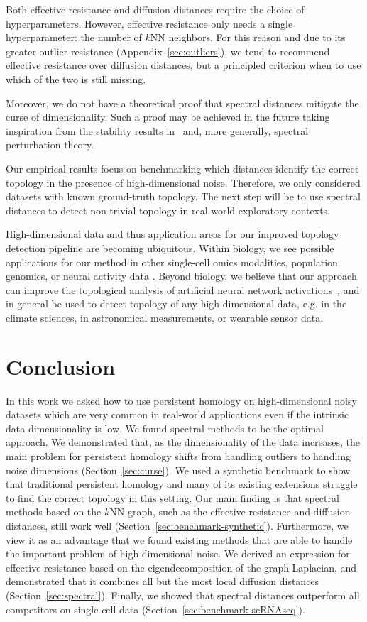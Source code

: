 \documentclass{article}
\theoremstyle{plain}
\theoremstyle{definition}
\theoremstyle{remark}
\begin{document}
Both effective resistance and diffusion distances require the choice of hyperparameters. However, effective resistance only needs a single hyperparameter: the number of $k$NN neighbors. For this reason and due to its greater outlier resistance (Appendix~\ref{sec:outliers}), we tend to recommend effective resistance over diffusion distances, but a principled criterion when to use which of the two is still missing.

Moreover, we do not have a theoretical proof that spectral distances mitigate the curse of dimensionality. Such a proof may be achieved in the future taking inspiration from the stability results in~\citep{carriere2020perslay, hiraoka2024curse, tran2019scale} and, more generally, spectral perturbation theory.

Our empirical results focus on benchmarking which distances identify the correct topology in the presence of high-dimensional noise. Therefore, we only considered datasets with known ground-truth topology. The next step will be to use spectral distances to detect non-trivial topology in real-world exploratory contexts.

High-dimensional data and thus application areas for our improved topology detection pipeline are becoming ubiquitous. Within biology, we see possible applications for our method in other single-cell omics modalities, population genomics, or neural activity data \citep{gardner2022toroidal, hermansen2024uncovering}. Beyond biology, we believe that our approach can improve the topological analysis of artificial neural network activations~\citep{naitzat2020topology}, and in general be used to detect topology of any high-dimensional data, e.g. in the climate sciences, in astronomical measurements, or wearable sensor data.

\section{Conclusion}

In this work we asked how to use persistent homology on high-dimensional noisy datasets which are very common in real-world applications even if the intrinsic data dimensionality is low. We found spectral methods to be  the optimal approach.
We demonstrated that, as the dimensionality of the data increases, the main problem for persistent homology shifts from handling outliers to handling noise dimensions (Section~\ref{sec:curse}). We used a synthetic benchmark to show that traditional persistent homology and many of its existing extensions struggle to find the correct topology in this setting. Our main finding is that spectral methods based on the $k$NN graph, such as the effective resistance and diffusion distances, still work well (Section~\ref{sec:benchmark-synthetic}). Furthermore, we view it as an advantage that we found existing methods that are able to handle the important problem of high-dimensional noise. We derived an expression for effective resistance based on the eigendecomposition of the graph Laplacian, and demonstrated that it combines all but the most local diffusion distances (Section~\ref{sec:spectral}).  Finally, we showed that spectral distances outperform all competitors on single-cell data (Section~\ref{sec:benchmark-scRNAseq}).
\end{document}

